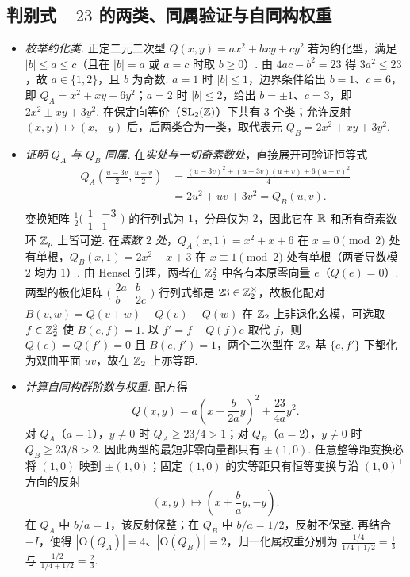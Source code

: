 \subsection{判别式 \texorpdfstring{$-23$}{-23} 的两类、同属验证与自同构权重}

\begin{itemize}
\item \emph{枚举约化类.} 正定二元二次型 $Q(x,y)=ax^2+bxy+cy^2$ 若为约化型，满足 $|b|\le a\le c$（且在 $|b|=a$ 或 $a=c$ 时取 $b\ge 0$）. 由 $4ac-b^2=23$ 得 $3a^2\le 23$，故 $a\in\{1,2\}$，且 $b$ 为奇数. $a=1$ 时 $|b|\le 1$，边界条件给出 $b=1$、$c=6$，即 $Q_A=x^2+xy+6y^2$；$a=2$ 时 $|b|\le 2$，给出 $b=\pm 1$、$c=3$，即 $2x^2\pm xy+3y^2$. 在保定向等价（$\operatorname{SL}_2(\mathbb{Z})$）下共有 $3$ 个类；允许反射 $(x,y)\mapsto(x,-y)$ 后，后两类合为一类，取代表元 $Q_B=2x^2+xy+3y^2$.

\item \emph{证明 $Q_A$ 与 $Q_B$ 同属.} 在\emph{实处与一切奇素数处}，直接展开可验证恒等式
\[
\begin{aligned}
Q_A\!\left(\frac{u-3v}{2},\frac{u+v}{2}\right)
&=\frac{(u-3v)^2+(u-3v)(u+v)+6(u+v)^2}{4}\\
&=2u^2+uv+3v^2=Q_B(u,v).
\end{aligned}
\]
变换矩阵 $\frac{1}{2}\bigl(\begin{smallmatrix}1&-3\\1&1\end{smallmatrix}\bigr)$ 的行列式为 $1$，分母仅为 $2$，因此它在 $\mathbb{R}$ 和所有奇素数环 $\mathbb{Z}_p$ 上皆可逆. 在\emph{素数 $2$ 处}，$Q_A(x,1)=x^2+x+6$ 在 $x\equiv 0\pmod 2$ 处有单根，$Q_B(x,1)=2x^2+x+3$ 在 $x\equiv 1\pmod 2$ 处有单根（两者导数模 $2$ 均为 $1$）. 由 Hensel 引理，两者在 $\mathbb{Z}_2^2$ 中各有本原零向量 $e$（$Q(e)=0$）. 两型的极化矩阵 $\bigl(\begin{smallmatrix}2a&b\\b&2c\end{smallmatrix}\bigr)$ 行列式都是 $23\in\mathbb{Z}_2^\times$，故极化配对 $B(v,w)=Q(v+w)-Q(v)-Q(w)$ 在 $\mathbb{Z}_2$ 上非退化幺模，可选取 $f\in\mathbb{Z}_2^2$ 使 $B(e,f)=1$. 以 $f'=f-Q(f)e$ 取代 $f$，则 $Q(e)=Q(f')=0$ 且 $B(e,f')=1$，两个二次型在 $\mathbb{Z}_2$-基 $\{e,f'\}$ 下都化为双曲平面 $uv$，故在 $\mathbb{Z}_2$ 上亦等距.

\item \emph{计算自同构群阶数与权重.} 配方得
\[
Q(x,y)=a\left(x+\frac{b}{2a}y\right)^2+\frac{23}{4a}y^2.
\]
对 $Q_A$（$a=1$），$y\ne 0$ 时 $Q_A\ge 23/4>1$；对 $Q_B$（$a=2$），$y\ne 0$ 时 $Q_B\ge 23/8>2$. 因此两型的最短非零向量都只有 $\pm(1,0)$. 任意整等距变换必将 $(1,0)$ 映到 $\pm(1,0)$；固定 $(1,0)$ 的实等距只有恒等变换与沿 $(1,0)^\perp$ 方向的反射
\[
(x,y)\longmapsto\left(x+\frac{b}{a}y,-y\right).
\]
在 $Q_A$ 中 $b/a=1$，该反射保整；在 $Q_B$ 中 $b/a=1/2$，反射不保整. 再结合 $-I$，便得 $|\mathrm O(Q_A)|=4$、$|\mathrm O(Q_B)|=2$，归一化属权重分别为 $\frac{1/4}{1/4+1/2}=\frac{1}{3}$ 与 $\frac{1/2}{1/4+1/2}=\frac{2}{3}$.
\end{itemize}
